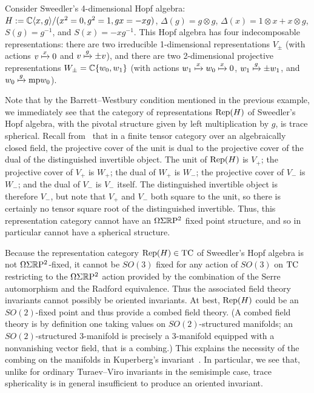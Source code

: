 \documentclass{amsart}
\begin{document}
\begin{example}
Consider Sweedler's 4-dimensional Hopf algebra: $H := \mathbb C \langle x, g \rangle / (x^2 = 0, g^2 = 1, gx = - xg)$, $\Delta(g) = g \otimes g$, $\Delta(x) = 1 \otimes x + x \otimes g$, $S(g) = g^{-1}$, and $S(x) = - xg^{-1}$.  This Hopf algebra has four indecomposable representations: there are two irreducible 1-dimensional representations $V_\pm$ (with actions $v \xmapsto{x} 0$ and $v \xmapsto{g} \pm v$), and there are two 2-dimensional projective representations $W_\pm = \mathbb C\{w_0, w_1\}$ (with actions $w_1 \xmapsto{x} w_0 \xmapsto{x} 0$, $w_1 \xmapsto{g} \pm w_1$, and $w_0 \xmapsto{g} \minusplus w_0$).

Note that by the Barrett--Westbury condition mentioned in the previous example, we immediately see that the category of representations $\mathrm{Rep}(H)$ of Sweedler's Hopf algebra, with the pivotal structure given by left multiplication by $g$, is trace spherical.  Recall from~\cite{MR2097289} that in a finite tensor category over an algebraically closed field, the projective cover of the unit is dual to the projective cover of the dual of the distinguished invertible object.  The unit of $\mathrm{Rep}(H)$ is $V_+$; the projective cover of $V_+$ is $W_+$; the dual of $W_+$ is $W_-$; the projective cover of $V_-$ is $W_-$; and the dual of $V_-$ is $V_-$ itself.  The distinguished invertible object is therefore $V_-$, but note that $V_+$ and $V_-$ both square to the unit, so there is certainly no tensor square root of the distinguished invertible.  Thus, this representation category cannot have an $\Omega \Sigma \mathbb R \mathrm{P}^2$ fixed point structure, and so in particular cannot have a spherical structure.
\end{example}


\begin{remark}
Because the representation category $\mathrm{Rep}(H) \in \mathrm{TC}$ of Sweedler's Hopf algebra is not $\Omega \Sigma \mathbb R \mathrm{P}^2$-fixed, it cannot be $SO(3)$ fixed for any action of $SO(3)$ on $\mathrm{TC}$ restricting to the $\Omega \Sigma \mathbb R \mathrm{P}^2$ action provided by the combination of the Serre automorphism and the Radford equivalence.  Thus the associated field theory invariants cannot possibly be oriented invariants.  At best, $\mathrm{Rep}(H)$ could be an $SO(2)$-fixed point and thus provide a combed field theory.  (A combed field theory is by definition one taking values on $SO(2)$-structured manifolds; an $SO(2)$-structured 3-manifold is precisely a 3-manifold equipped with a nonvanishing vector field, that is a combing.)  This explains the necessity of the combing on the manifolds in Kuperberg's invariant~\cite{MR1394749}.  In particular, we see that, unlike for ordinary Turaev--Viro invariants in the semisimple case, trace sphericality is in general insufficient to produce an oriented invariant.
\end{remark}
\end{document}
